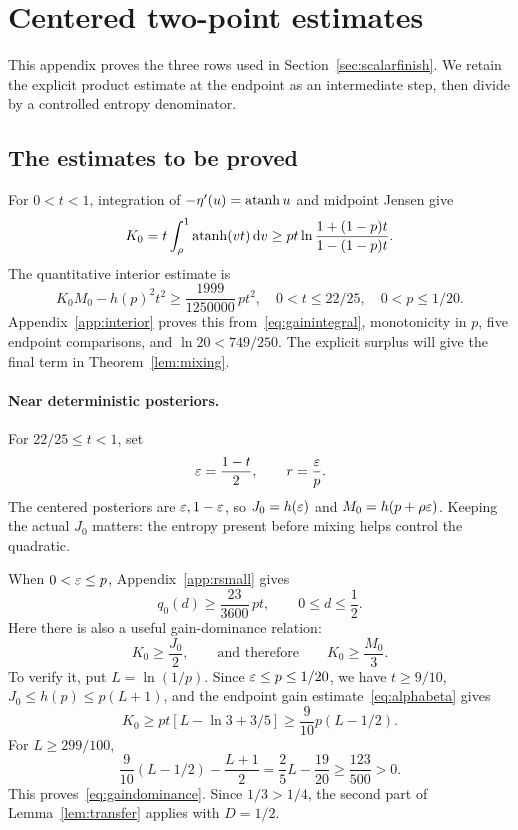 \section{Centered two-point estimates}\label{app:centered}
This appendix proves the three rows used in Section~\ref{sec:scalarfinish}. We retain the explicit product estimate at the endpoint as an intermediate step, then divide by a controlled entropy denominator.

\subsection{The estimates to be proved}
For $0<t<1$, integration of $-\eta'(u)=\operatorname{atanh} u$ and midpoint Jensen give
\begin{equation}\label{eq:gainintegral}
K_0=t\int_\rho^1\operatorname{atanh}(vt)\,\mathrm d v
\ge pt\ln\frac{1+(1-p)t}{1-(1-p)t}.
\end{equation}
The quantitative interior estimate is
\begin{equation}\label{eq:interiorproduct}
K_0M_0-h(p)^2t^2\ge\frac{1999}{1250000}\,pt^2,
\quad 0<t\le22/25,\quad 0<p\le1/20.
\end{equation}
Appendix~\ref{app:interior} proves this from~\eqref{eq:gainintegral}, monotonicity in $p$, five endpoint comparisons, and $\ln20<749/250$. The explicit surplus will give the final term in Theorem~\ref{lem:mixing}.

\paragraph{Near deterministic posteriors.}
For $22/25\le t<1$, set
\begin{equation}\label{eq:epsr}
\varepsilon=\frac{1-t}{2},\qquad r=\frac{\varepsilon}{p}.
\end{equation}
The centered posteriors are $\varepsilon,1-\varepsilon$, so
$J_0=h(\varepsilon)$ and $M_0=h(p+\rho\varepsilon)$. Keeping the actual $J_0$ matters: the entropy present before mixing helps control the quadratic.

When $0<\varepsilon\le p$, Appendix~\ref{app:rsmall} gives
\begin{equation}\label{eq:endpointinterval}
q_0(d)\ge\frac{23}{3600}\,pt,
\qquad 0\le d\le\frac12.
\end{equation}
Here there is also a useful gain-dominance relation:
\begin{equation}\label{eq:gaindominance}
K_0\ge\frac{J_0}{2},\qquad\text{and therefore}\qquad K_0\ge\frac{M_0}{3}.
\end{equation}
To verify it, put $L=\ln(1/p)$. Since $\varepsilon\le p\le1/20$, we have $t\ge9/10$, $J_0\le h(p)\le p(L+1)$, and the endpoint gain estimate~\eqref{eq:alphabeta} gives
\[
K_0\ge pt[L-\ln3+3/5]\ge\frac9{10}p(L-1/2).
\]
For $L\ge299/100$,
\[
\frac9{10}(L-1/2)-\frac{L+1}{2}
=\frac25L-\frac{19}{20}\ge\frac{123}{500}>0.
\]
This proves~\eqref{eq:gaindominance}. Since $1/3>1/4$, the second part of Lemma~\ref{lem:transfer} applies with $D=1/2$.


